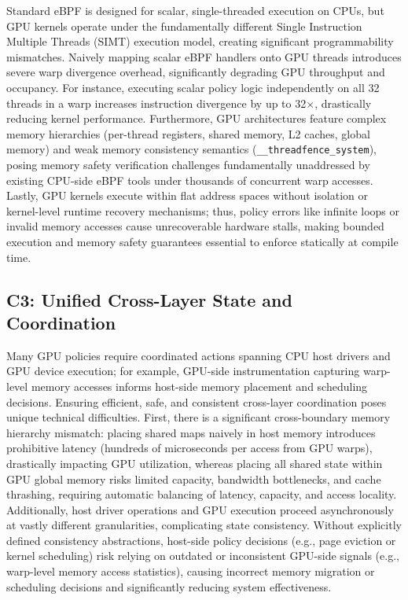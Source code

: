 Standard eBPF is designed for scalar, single-threaded execution on CPUs, but GPU kernels operate under the fundamentally different Single Instruction Multiple Threads (SIMT) execution model, creating significant programmability mismatches. Naively mapping scalar eBPF handlers onto GPU threads introduces severe warp divergence overhead, significantly degrading GPU throughput and occupancy. For instance, executing scalar policy logic independently on all 32 threads in a warp increases instruction divergence by up to 32$\times$, drastically reducing kernel performance. Furthermore, GPU architectures feature complex memory hierarchies (per-thread registers, shared memory, L2 caches, global memory) and weak memory consistency semantics (\texttt{\_\_threadfence\_system}), posing memory safety verification challenges fundamentally unaddressed by existing CPU-side eBPF tools under thousands of concurrent warp accesses. Lastly, GPU kernels execute within flat address spaces without isolation or kernel-level runtime recovery mechanisms; thus, policy errors like infinite loops or invalid memory accesses cause unrecoverable hardware stalls, making bounded execution and memory safety guarantees essential to enforce statically at compile time.

\subsection{C3: Unified Cross-Layer State and Coordination}

Many GPU policies require coordinated actions spanning CPU host drivers and GPU device execution; for example, GPU-side instrumentation capturing warp-level memory accesses informs host-side memory placement and scheduling decisions. Ensuring efficient, safe, and consistent cross-layer coordination poses unique technical difficulties. First, there is a significant cross-boundary memory hierarchy mismatch: placing shared maps naively in host memory introduces prohibitive latency (hundreds of microseconds per access from GPU warps), drastically impacting GPU utilization, whereas placing all shared state within GPU global memory risks limited capacity, bandwidth bottlenecks, and cache thrashing, requiring automatic balancing of latency, capacity, and access locality. Additionally, host driver operations and GPU execution proceed asynchronously at vastly different granularities, complicating state consistency. Without explicitly defined consistency abstractions, host-side policy decisions (e.g., page eviction or kernel scheduling) risk relying on outdated or inconsistent GPU-side signals (e.g., warp-level memory access statistics), causing incorrect memory migration or scheduling decisions and significantly reducing system effectiveness.

